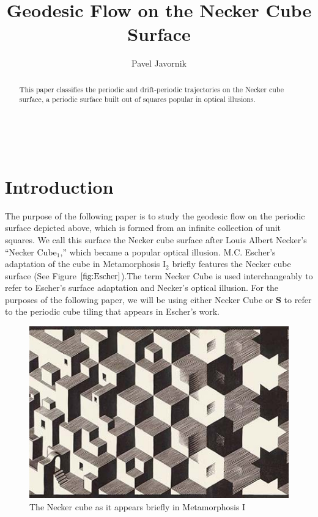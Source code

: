 \documentclass[]{article}
\title{Geodesic Flow on the Necker Cube Surface}
\date{}
\author{Pavel Javornik}
\begin{document}
\maketitle



\begin{center}

\\
\end{center}

\begin{abstract}
This paper classifies the periodic and drift-periodic trajectories on the Necker cube surface, a periodic surface built out of squares popular in optical illusions.
\end{abstract}



\newpage
\section{Introduction}

The purpose of the following paper is to study the geodesic flow on the periodic surface depicted above, which is formed from an infinite collection of unit squares. We call this surface the Necker cube surface after Louis Albert Necker's ``Necker Cube$_{1}$,'' which became a popular optical illusion. M.C. Escher's adaptation of the cube in Metamorphosis I$_{2}$ briefly features the Necker cube surface (See Figure $\ref{fig:Escher}$).The term Necker Cube is used interchangeably to refer to Escher's surface adaptation and Necker's optical illusion. For the purposes of the following paper, we will be using either Necker Cube or $\mathbf{S}$ to refer to the periodic cube tiling that appears in Escher's work.


\begin{figure}[H]
\begin{center}
\includegraphics[scale=0.5]{escher.jpg}
\caption{The Necker cube as it appears briefly in Metamorphosis I}
\label{fig:Escher}
\end{center}
\end{figure}
\end{document}
